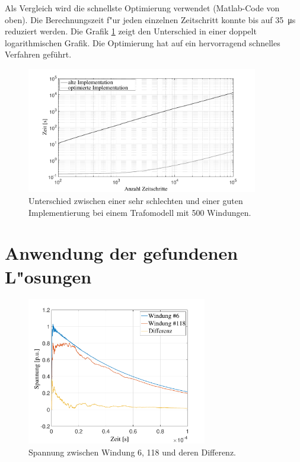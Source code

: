 \begin{refsection}
Als Vergleich wird die schnellste Optimierung verwendet (Matlab-Code von oben). Die Berechnungszeit f"ur jeden einzelnen Zeitschritt konnte bis auf \SI{35}{\micro \second} reduziert werden. Die Grafik \ref{trafo:Optimierung} zeigt den Unterschied in einer doppelt logarithmischen Grafik. Die Optimierung hat auf ein hervorragend schnelles Verfahren geführt.

\begin{figure}
	\centering
	\includegraphics[width=0.9\textwidth]{./trafo/images/differenceOptimization.pdf}
	\caption{Unterschied zwischen einer sehr schlechten und einer guten Implementierung bei einem Trafomodell mit 500 Windungen.}
	\label{trafo:Optimierung}
\end{figure}

\section{Anwendung der gefundenen L"osungen}

\begin{figure}
	\centering
	\includegraphics[width=0.7\textwidth]{./trafo/images/solution.pdf}
	\caption{Spannung zwischen Windung 6, 118 und deren Differenz.}
	\label{fig:solution}
\end{figure}


\end{refsection}
